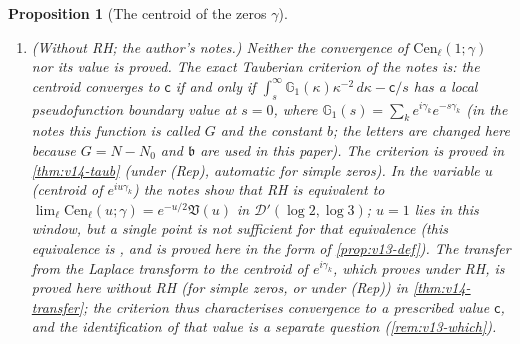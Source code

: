 \documentclass[11pt,a4paper]{article}
\numberwithin{equation}{section}
\newtheorem{proposition}[theorem]{Proposition}
\theoremstyle{definition}
\theoremstyle{remark}
\begin{document}
\begin{proposition}[The centroid of the zeros $\gamma$]
\begin{enumerate}[label=(\alph*),leftmargin=*]
\item \emph{(Without RH; the author's notes.)} Neither the convergence of $\mathrm{Cen}_\ell(1;\gamma)$ nor its value is proved. The exact Tauberian criterion of the notes is: the centroid converges to $\mathsf c$ if and only if $\int_s^\infty\mathbb G_1(\kappa)\kappa^{-2}\,d\kappa-\mathsf c/s$ has a local pseudofunction boundary value at $s=0$, where $\mathbb G_1(s)=\sum_ke^{i\gamma_k}e^{-s\gamma_k}$ (in the notes this function is called $G$ and the constant $b$; the letters are changed here because $G=N-N_0$ and $\mathfrak b$ are used in this paper). The criterion is proved in \cref{thm:v14-taub} (under (Rep), automatic for simple zeros). In the variable $u$ (centroid of $e^{iu\gamma_k}$) the notes show that RH is equivalent to $\lim_\ell\mathrm{Cen}_\ell(u;\gamma)=e^{-u/2}\mathfrak V(u)$ in $\mathcal D'(\log2,\log3)$; $u=1$ lies in this window, but a single point is not sufficient for that equivalence (this equivalence is \cite[Thm.~5.5]{CasanaV26}, and is proved here in the form of \cref{prop:v13-def}). The transfer from the Laplace transform to the centroid of $e^{i\gamma_k}$, which \cite{CasanaV26} proves under RH, is proved here without RH (for simple zeros, or under (Rep)) in \cref{thm:v14-transfer}; the criterion thus characterises convergence to a prescribed value $\mathsf c$, and the identification of that value is a separate question (\cref{rem:v13-which}).
\end{enumerate}
\end{proposition}
\end{document}
